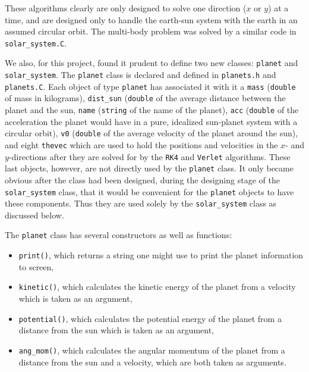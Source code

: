 \documentclass[12pt]{article}
\numberwithin{equation}{section}
\begin{document}
\noindent These algorithms clearly are only designed to solve one direction ($x$ or $y$) at a time, and are designed only to handle the earth-sun system with the earth in an assumed circular orbit.  The multi-body problem was solved by a similar code in \texttt{solar\_system.C}.
\par We also, for this project, found it prudent to define two new classes: \texttt{planet} and \texttt{solar\_system}.  The \texttt{planet} class is declared and defined in \texttt{planets.h} and \texttt{planets.C}.  Each object of type \texttt{planet} has associated it with it a \texttt{mass} (\texttt{double} of mass in kilograms), \texttt{dist\_sun} (\texttt{double} of the average distance between the planet and the sun, \texttt{name} (\texttt{string} of the name of the planet), \texttt{acc} (\texttt{double} of the acceleration the planet would have in a pure, idealized sun-planet system with a circular orbit), \texttt{v0} (\texttt{double} of the average velocity of the planet around the sun), and eight \texttt{thevec} which are used to hold the positions and velocities in the $x$- and $y$-directions after they are solved for by the \texttt{RK4} and \texttt{Verlet} algorithms.  These last objects, however, are not directly used by the \texttt{planet} class.  It only became obvious after the class had been designed, during the designing stage of the \texttt{solar\_system} class, that it would be convenient for the \texttt{planet} objects to have these components.  Thus they are used solely by the \texttt{solar\_system} class as discussed below. 
\par The \texttt{planet} class has several constructors as well as functions:

\begin{itemize}
\item \texttt{print()}, which returns a string one might use to print the planet information to screen,
\item \texttt{kinetic()}, which calculates the kinetic energy of the planet from a velocity which is taken as an argument,
\item \texttt{potential()}, which calculates the potential energy of the planet from a distance from the sun which is taken as an argument,
\item \texttt{ang\_mom()}, which calculates the angular momentum of the planet from a distance from the sun and a velocity, which are both taken as arguments.
\end{itemize}
\end{document}
